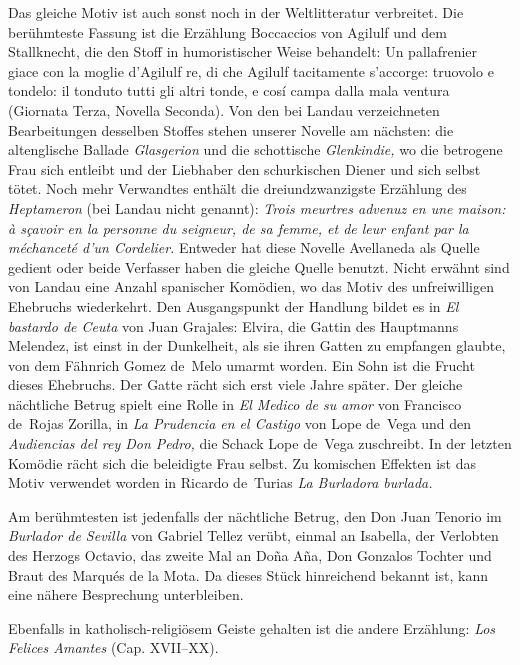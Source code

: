 Das gleiche Motiv ist auch sonst noch in der Weltlitteratur verbreitet.
Die berühmteste Fassung ist die Erzählung Boccaccios von
Agilulf und dem Stallknecht, die den Stoff in humoristischer Weise
behandelt: {\itquoted\italian Un pallafrenier giace con la moglie d'Agilulf re, di che
Agilulf tacitamente s'accorge: truovolo e tondelo: il tonduto tutti gli
altri tonde, e cosí campa dalla mala ventura} (Giornata Terza, Novella
Seconda). Von den bei Landau verzeichneten Bearbeitungen desselben
Stoffes stehen unserer Novelle am nächsten: die altenglische Ballade
{\it Glasgerion} und die schottische {\it Glenkindie,} wo die betrogene Frau sich
entleibt und der Liebhaber den schurkischen Diener und sich selbst
tötet. Noch mehr Verwandtes enthält die dreiundzwanzigste Erzählung
des {\it Heptameron} (bei Landau nicht genannt): {\it\french Trois meurtres advenuz en
une maison: à sçavoir en la personne du seigneur, de sa femme, et de
leur enfant par la méchanceté d'un Cordelier.} Entweder hat diese
Novelle Avellaneda als Quelle gedient oder beide Verfasser haben die
gleiche Quelle benutzt. Nicht erwähnt sind von Landau eine Anzahl
spanischer Komödien, wo das Motiv des unfreiwilligen Ehebruchs wiederkehrt.
Den Ausgangspunkt der Handlung bildet es in {\it\spanish El bastardo de
Ceuta} von Juan Grajales: Elvira, die Gattin des Hauptmanns Melendez,
ist einst in der Dunkelheit, als sie ihren Gatten zu empfangen glaubte,
von dem Fähnrich Gomez de~Melo umarmt worden. Ein Sohn ist die
Frucht dieses Ehebruchs. Der Gatte rächt sich erst viele Jahre später.
Der gleiche nächtliche Betrug spielt eine Rolle in {\it\spanish El Medico de su amor}
von Francisco de~Rojas Zorilla, in {\it\spanish La Prudencia en el Castigo} von
Lope de~Vega und den {\it\spanish Audiencias del rey Don Pedro,} die Schack
Lope de~Vega zuschreibt. In der letzten Komödie rächt sich die
beleidigte Frau selbst. Zu komischen Effekten ist das Motiv verwendet
worden in Ricardo de~Turias {\it\spanish La Burladora burlada.}

Am berühmtesten ist jedenfalls der nächtliche Betrug, den Don
Juan Tenorio im {\it\spanish Burlador de Sevilla} von Gabriel Tellez verübt, einmal
an Isabella, der Verlobten des Herzogs Octavio, das zweite Mal an Doña
Aña, Don Gonzalos Tochter und Braut des Marqués de la Mota. Da dieses
Stück hinreichend bekannt ist, kann eine nähere Besprechung unterbleiben.

Ebenfalls in katholisch-religiösem Geiste gehalten ist die andere
Erzählung: {\it\spanish Los Felices Amantes} (Cap. XVII--XX).

